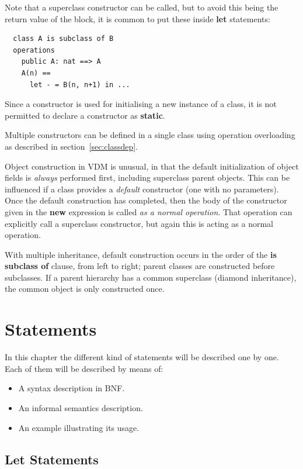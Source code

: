 \documentclass{overturerepchap}
\newcommand{\keyw}[1]{{\bf\ttfamily #1}}
\begin{document}
{Note that a superclass constructor can be called, but to avoid this
being the return value of the block, it is common to put these inside
\keyw{let} statements:

\begin{lstlisting}
  class A is subclass of B
  operations
    public A: nat ==> A
    A(n) ==
      let - = B(n, n+1) in ...
\end{lstlisting}

Since a constructor is used for initialising a new instance of a class,
it is not permitted to declare a constructor as \keyw{static}.

Multiple constructors can be defined in a single class using
operation overloading as described in section~\ref{sec:classdep}.

Object construction in VDM is unusual, in that the default initialization
of object fields is \emph{always} performed first, including superclass
parent objects. This can be influenced if a class provides a \emph{default}
constructor (one with no parameters). Once the default construction has
completed, then the body of the constructor given in the \keyw{new}
expression is called \emph{as a normal operation}. That operation can
explicitly call a superclass constructor, but again this is acting as
a normal operation.

With multiple inheritance, default construction occurs in the order of
the \keyw{is subclass of} clause, from left to right; parent classes are
constructed before subclasses. If a parent hierarchy has a common
superclass (diamond inheritance), the common object is only constructed
once.


\chapter{Statements}\label{sec:stmt}

In this chapter the different kind of statements will be described
one by one. Each of them will be described by means of:
\begin{itemize}
\item A syntax description in BNF.
\item An informal semantics description.
\item An example illustrating its usage.
\end{itemize}

\section{Let Statements}\label{letstmt}

}
\end{document}
